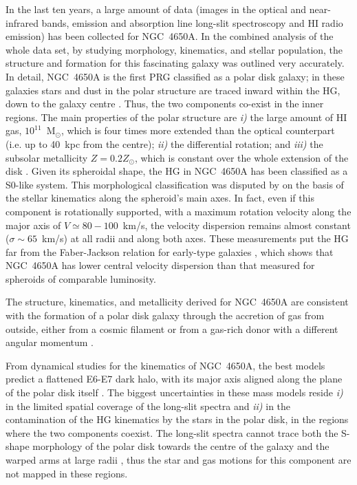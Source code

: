 \documentclass{aa}
\begin{document}
In the last ten years, a large amount of data (images
in the optical and near-infrared bands, emission and absorption line
long-slit spectroscopy and HI radio emission) has been collected for NGC~4650A. In
the combined analysis of the whole data set, by studying morphology,
kinematics, and stellar population, the structure and formation for
this fascinating galaxy was outlined very accurately.
%
In detail, NGC~4650A is the first PRG classified as a polar disk galaxy; in these galaxies stars and dust in the polar structure are traced inward within
the HG, down to the galaxy centre
\citep{Arn97,Iodice02,Gal02,Swaters2003}. Thus, the two components
co-exist in the inner regions.  The main properties of the polar
structure are {\it i)} the large amount of HI gas,
$10^{11}$~M$_{\odot}$, which is four times more extended than the
optical counterpart (i.e. up to 40~kpc from the centre); {\it ii)} the
differential rotation; and {\it iii)} the subsolar metallicity
$Z=0.2 Z_{\odot}$, which is constant over the whole extension of the
disk \citep{Spav10}.
%
Given its spheroidal shape, the HG in NGC~4650A has been classified as
a S0-like system.  This morphological classification was disputed by
\citet{Iod06} on the basis of the stellar kinematics along the
spheroid's main axes. In fact, even if this component is
rotationally supported, with a maximum rotation velocity along the
major axis of $V \simeq 80 - 100$~km/s, the velocity dispersion
remains almost constant ($\sigma \sim 65$~km/s) at all radii and along
both axes. These measurements put the HG far from the Faber-Jackson
relation for early-type galaxies \citep[see][]{Iod06, Iod2014}, which
shows that NGC~4650A has lower central velocity dispersion than that
measured for spheroids of comparable luminosity.

The structure, kinematics, and metallicity derived for NGC~4650A are
consistent with the formation of a polar disk galaxy through the
accretion of gas from outside, either from a cosmic filament or from a
gas-rich donor with a different angular momentum \citep{Spav10,
  Combes2014}.

From dynamical studies for the kinematics of NGC~4650A, the best
models predict a flattened E6-E7  dark halo, with its major axis
aligned along the plane of the polar disk itself \citep{Combes1996,
  Nap2014}.  The biggest uncertainties in these mass models reside 
{\it i)} in the limited spatial coverage of the long-slit spectra and
{\it ii)} in the contamination of the HG kinematics by the stars in
the polar disk, in the regions where the two components coexist. The
long-slit spectra cannot trace both the S-shape morphology of the
polar disk towards the centre of the galaxy \citep{Iod02} and the
warped arms at large radii \citep{Swaters2003}, thus the star and gas
motions for this component are not mapped in these regions.
\end{document}
